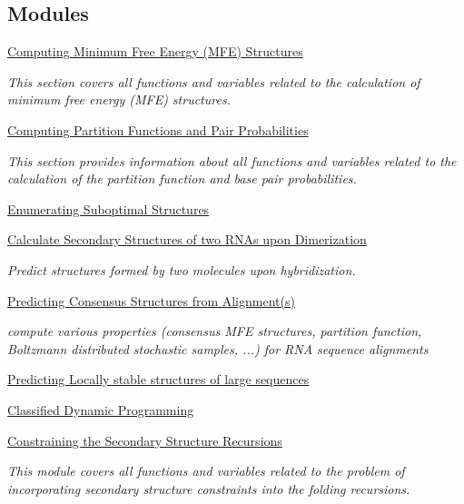 \subsection*{Modules}
\begin{DoxyCompactItemize}
\item 
\hyperlink{group__mfe__fold}{Computing Minimum Free Energy (\-M\-F\-E) Structures}
\begin{DoxyCompactList}\small\item\em This section covers all functions and variables related to the calculation of minimum free energy (M\-F\-E) structures. \end{DoxyCompactList}\item 
\hyperlink{group__pf__fold}{Computing Partition Functions and Pair Probabilities}
\begin{DoxyCompactList}\small\item\em This section provides information about all functions and variables related to the calculation of the partition function and base pair probabilities. \end{DoxyCompactList}\item 
\hyperlink{group__subopt__fold}{Enumerating Suboptimal Structures}
\item 
\hyperlink{group__cofold}{Calculate Secondary Structures of two R\-N\-As upon Dimerization}
\begin{DoxyCompactList}\small\item\em Predict structures formed by two molecules upon hybridization. \end{DoxyCompactList}\item 
\hyperlink{group__consensus__fold}{Predicting Consensus Structures from Alignment(s)}
\begin{DoxyCompactList}\small\item\em compute various properties (consensus M\-F\-E structures, partition function, Boltzmann distributed stochastic samples, ...) for R\-N\-A sequence alignments \end{DoxyCompactList}\item 
\hyperlink{group__local__fold}{Predicting Locally stable structures of large sequences}
\item 
\hyperlink{group__class__fold}{Classified Dynamic Programming}
\item 
\hyperlink{group__constraints}{Constraining the Secondary Structure Recursions}
\begin{DoxyCompactList}\small\item\em This module covers all functions and variables related to the problem of incorporating secondary structure constraints into the folding recursions. \end{DoxyCompactList}\end{DoxyCompactItemize}
